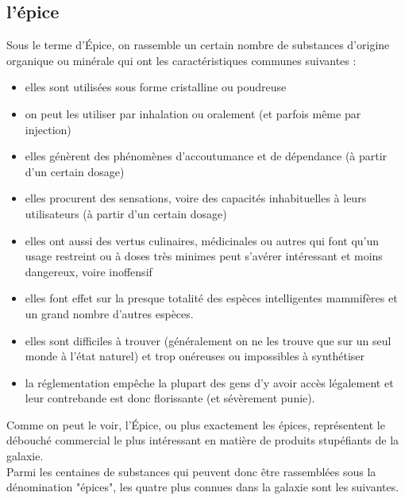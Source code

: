 \documentclass[twoside]{article}
\begin{document}
\subsection{l'épice}
Sous le terme d'Épice, on rassemble un certain nombre de substances d'origine organique ou minérale qui ont les caractéristiques communes suivantes :

\begin{itemize}
	\item elles sont utilisées sous forme cristalline ou poudreuse
	\item on peut les utiliser par inhalation ou oralement (et parfois même par injection)
	\item elles génèrent des phénomènes d'accoutumance et de dépendance (à partir d'un certain dosage)
	\item elles procurent des sensations, voire des capacités inhabituelles à leurs utilisateurs (à partir d'un certain dosage)
	\item elles ont aussi des vertus culinaires, médicinales ou autres qui font qu'un usage restreint ou à doses très minimes peut s'avérer intéressant et moins dangereux, voire inoffensif
	\item elles font effet sur la presque totalité des espèces intelligentes mammifères et un grand nombre d'autres espèces.
	\item elles sont difficiles à trouver (généralement on ne les trouve que sur un seul monde à l'état naturel) et trop onéreuses ou impossibles à synthétiser
	\item la réglementation empêche la plupart des gens d'y avoir accès légalement et leur contrebande est donc florissante (et sévèrement punie).
\end{itemize}

Comme on peut le voir, l'Épice, ou plus exactement les épices, représentent le débouché commercial le plus intéressant en matière de produits stupéfiants de la galaxie.\\

Parmi les centaines de substances qui peuvent donc être rassemblées sous la dénomination "épices", les quatre plus connues dans la galaxie sont les suivantes.
\end{document}
